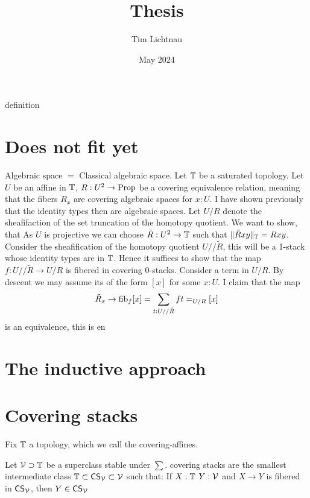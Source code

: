 \documentclass{article}
\title{Thesis}
\author{Tim Lichtnau }
\date{May 2024}
\newcommand{\CS}{\mathsf{CS}}
\begin{document}
\newtheorem*{warning}{Warning}{definition}
\maketitle
\section{Does not fit yet}
Algebraic space $=$ Classical algebraic space.
Let $\mathbb{T}$ be a saturated topology.
Let $U$ be an affine in $\mathbb{T}$, $R : U^2 \to \operatorname{Prop}$ be a covering equivalence relation, meaning that the fibers $R_x$ are covering algebraic spaces for $x : U$. I have shown previously that the identity types then are algebraic spaces. Let $U / R$ denote the sheafifaction of the set truncation of the homotopy quotient. We want to show, that  As $U$ is projective we can choose $\tilde R : U^2 \to \mathbb{T}$ such that $\| \tilde R x y \|_{\mathbb{T}}= R x y$. Consider the sheafification of the homotopy quotient $U // \tilde R$, this will be a 1-stack whose identity types are in $\mathbb{T}$. Hence it suffices to show that the map $f : U // \tilde R \to U / R$ is fibered in covering 0-stacks. Consider a term in $U / R$. By descent we may assume its of the form $[x]$ for some $x : U$. I claim that the map \[\tilde R_x \to \operatorname{fib}_f [x] = \sum_{t: U // \tilde R} f t =_{U/R} [x]\]
is an equivalence, this is en
\section{The inductive approach}


\section{Covering stacks}
Fix $\mathbb{T}$ a topology, which we call the covering-affines.

\begin{definition}
	Let $\mathcal{V} \supset \mathbb{T}$ be a superclass stable under $\sum$. covering stacks are the smallest intermediate class $\bT \subset \CS_\cV \subset \cV$ such that: If $X : \mathbb{T}$  $Y : \mathcal{V}$ and $X \to Y$ is fibered in $\CS_\cV$, then $Y \in \CS_\cV$

\end{definition}
\end{document}
